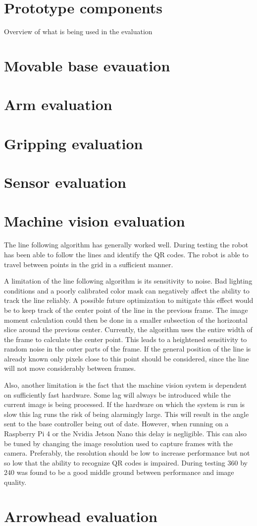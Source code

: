 \section*{Prototype components}
Overview of what is being used in the evaluation
\section*{Movable base evauation}
\section*{Arm evaluation}
\section*{Gripping evaluation}
\section*{Sensor evaluation}
\section*{Machine vision evaluation}
The line following algorithm has generally worked well.
During testing the robot has been able to follow the lines and identify the QR codes.
The robot is able to travel between points in the grid in a sufficient manner.

A limitation of the line following algorithm is its sensitivity to noise.
Bad lighting conditions and a poorly calibrated color mask can negatively affect the ability to track the line reliably.
A possible future optimization to mitigate this effect would be to keep track of the center point of the line in the previous frame.
The image moment calculation could then be done in a smaller subsection of the horizontal slice around the previous center.
Currently, the algorithm uses the entire width of the frame to calculate the center point.
This leads to a heightened sensitivity to random noise in the outer parts of the frame.
If the general position of the line is already known only pixels close to this point should be considered, since the line will not move considerably between frames.

Also, another limitation is the fact that the machine vision system is dependent on sufficiently fast hardware.
Some lag will always be introduced while the current image is being processed.
If the hardware on which the system is run is slow this lag runs the risk of being alarmingly large.
This will result in the angle sent to the base controller being out of date.
However, when running on a Raspberry Pi 4 or the Nvidia Jetson Nano this delay is negligible.
This can also be tuned by changing the image resolution used to capture frames with the camera.
Preferably, the resolution should be low to increase performance but not so low that the ability to recognize QR codes is impaired.
During testing $360$ by $240$ was found to be a good middle ground between performance and image quality.
\section*{Arrowhead evaluation}